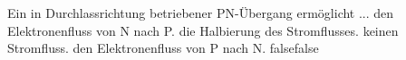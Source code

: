     {Ein in Durchlassrichtung betriebener PN-Übergang ermöglicht ...}
    {den Elektronenfluss von N nach P.}
    {die Halbierung des Stromflusses.}
    {keinen Stromfluss.}
    {den Elektronenfluss von P nach N.}
    {false}{false}